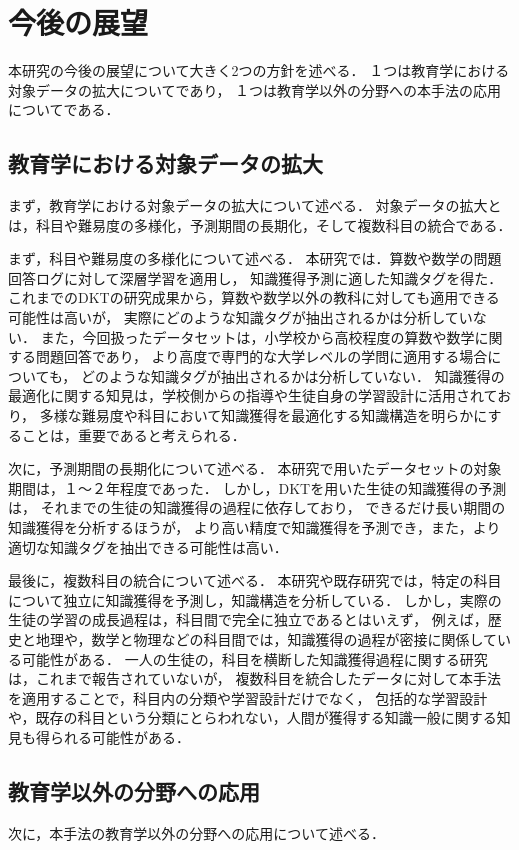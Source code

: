 \section{今後の展望}
本研究の今後の展望について大きく2つの方針を述べる．
１つは教育学における対象データの拡大についてであり，
１つは教育学以外の分野への本手法の応用についてである．


\subsection{教育学における対象データの拡大}
まず，教育学における対象データの拡大について述べる．
対象データの拡大とは，科目や難易度の多様化，予測期間の長期化，そして複数科目の統合である．


まず，科目や難易度の多様化について述べる．
本研究では．算数や数学の問題回答ログに対して深層学習を適用し，
知識獲得予測に適した知識タグを得た．
これまでのDKTの研究成果から，算数や数学以外の教科に対しても適用できる可能性は高いが，
実際にどのような知識タグが抽出されるかは分析していない．
また，今回扱ったデータセットは，小学校から高校程度の算数や数学に関する問題回答であり，
より高度で専門的な大学レベルの学問に適用する場合についても，
どのような知識タグが抽出されるかは分析していない．
知識獲得の最適化に関する知見は，学校側からの指導や生徒自身の学習設計に活用されており，
多様な難易度や科目において知識獲得を最適化する知識構造を明らかにすることは，重要であると考えられる．


次に，予測期間の長期化について述べる．
本研究で用いたデータセットの対象期間は，１〜２年程度であった．
しかし，DKTを用いた生徒の知識獲得の予測は，
それまでの生徒の知識獲得の過程に依存しており，
できるだけ長い期間の知識獲得を分析するほうが，
より高い精度で知識獲得を予測でき，また，より適切な知識タグを抽出できる可能性は高い．


最後に，複数科目の統合について述べる．
本研究や既存研究では，特定の科目について独立に知識獲得を予測し，知識構造を分析している．
しかし，実際の生徒の学習の成長過程は，科目間で完全に独立であるとはいえず，
例えば，歴史と地理や，数学と物理などの科目間では，知識獲得の過程が密接に関係している可能性がある．
一人の生徒の，科目を横断した知識獲得過程に関する研究は，これまで報告されていないが，
複数科目を統合したデータに対して本手法を適用することで，科目内の分類や学習設計だけでなく，
包括的な学習設計や，既存の科目という分類にとらわれない，人間が獲得する知識一般に関する知見も得られる可能性がある．



\subsection{教育学以外の分野への応用}
次に，本手法の教育学以外の分野への応用について述べる．

